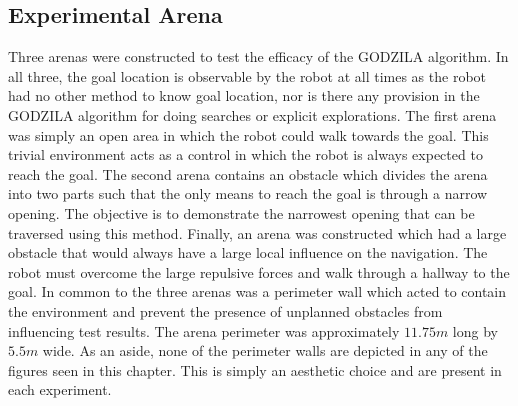 \subsection{Experimental Arena} \label{subsec:arena}
Three arenas were constructed to test the efficacy of the GODZILA algorithm.
In all three, the goal location is observable by the robot at all times as the robot had no other
method to know goal location, nor is there any provision in the GODZILA algorithm for doing
searches or explicit explorations.
The first arena was simply an open area in which the robot could walk towards the goal.
This trivial environment acts as a control in which the robot is always expected to
reach the goal. The second arena contains an obstacle which divides the arena into two
parts such that the only means to reach the goal is through a narrow opening. The objective is
to demonstrate the narrowest opening that can be traversed using this method.
Finally, an arena was constructed which had a large obstacle that would always have a large
local influence on the navigation. The robot must overcome the large repulsive forces
and walk through a hallway to the goal.
In common to the three arenas was a perimeter wall which acted to contain the environment and
prevent the presence of unplanned obstacles from influencing test results. The arena perimeter
was approximately $11.75 m$ long by $5.5 m$ wide. As an aside, none of the perimeter walls are
depicted in any of the figures seen in this chapter. This is simply an aesthetic choice and are
present in each experiment.

